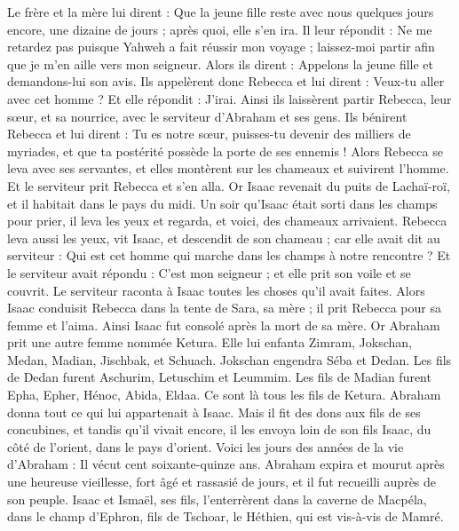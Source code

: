 \begin{multicols}{2}
Le frère et la mère lui dirent : Que la jeune fille reste avec nous quelques jours encore, une dizaine de jours ; après quoi, elle s'en ira.
Il leur répondit : Ne me retardez pas puisque Yahweh a fait réussir mon voyage ; laissez-moi partir afin que je m'en aille vers mon seigneur.
Alors ils dirent : Appelons la jeune fille et demandons-lui son avis.
Ils appelèrent donc Rebecca et lui dirent : Veux-tu aller avec cet homme ? Et elle répondit : J'irai.
Ainsi ils laissèrent partir Rebecca, leur sœur, et sa nourrice, avec le serviteur d'Abraham et ses gens.
Ils bénirent Rebecca et lui dirent : Tu es notre sœur, puisses-tu devenir des milliers de myriades, et que ta postérité possède la porte de ses ennemis !
Alors Rebecca se leva avec ses servantes, et elles montèrent sur les chameaux et suivirent l'homme. Et le serviteur prit Rebecca et s'en alla.
Or Isaac revenait du puits de Lachaï-roï, et il habitait dans le pays du midi.
Un soir qu'Isaac était sorti dans les champs pour prier, il leva les yeux et regarda, et voici, des chameaux arrivaient.
Rebecca leva aussi les yeux, vit Isaac, et descendit de son chameau ;
car elle avait dit au serviteur : Qui est cet homme qui marche dans les champs à notre rencontre ? Et le serviteur avait répondu : C'est mon seigneur ; et elle prit son voile et se couvrit.
Le serviteur raconta à Isaac toutes les choses qu'il avait faites.
Alors Isaac conduisit Rebecca dans la tente de Sara, sa mère ; il prit Rebecca pour sa femme et l'aima. Ainsi Isaac fut consolé après la mort de sa mère.
\VerseOne{}Or Abraham prit une autre femme nommée Ketura.
Elle lui enfanta Zimram, Jokschan, Medan, Madian, Jischbak, et Schuach.
Jokschan engendra Séba et Dedan. Les fils de Dedan furent Aschurim, Letuschim et Leummim.
Les fils de Madian furent Epha, Epher, Hénoc, Abida, Eldaa. Ce sont là tous les fils de Ketura.
Abraham donna tout ce qui lui appartenait à Isaac.
Mais il fit des dons aux fils de ses concubines, et tandis qu'il vivait encore, il les envoya loin de son fils Isaac, du côté de l'orient, dans le pays d'orient.
Voici les jours des années de la vie d'Abraham : Il vécut cent soixante-quinze ans.
Abraham expira et mourut après une heureuse vieillesse, fort âgé et rassasié de jours, et il fut recueilli auprès de son peuple.
Isaac et Ismaël, ses fils, l'enterrèrent dans la caverne de Macpéla, dans le champ d'Ephron, fils de Tschoar, le Héthien, qui est vis-à-vis de Mamré.

\end{multicols}
